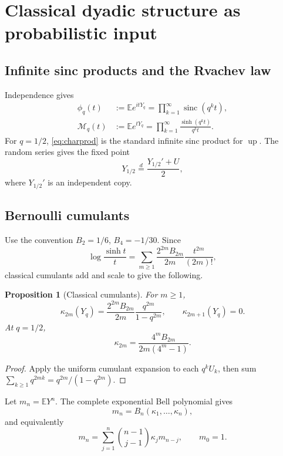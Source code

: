\documentclass[11pt]{article}
\newtheorem{proposition}[theorem]{Proposition}
\theoremstyle{definition}
\newcommand{\Up}{\operatorname{up}}
\newcommand{\sinc}{\operatorname{sinc}}
\newcommand{\E}{\mathbb{E}}
\begin{document}
\section{Classical dyadic structure as probabilistic input}
\subsection{Infinite sinc products and the Rvachev law}
Independence gives
\begin{align}
\phi_q(t)&:=\E e^{itY_q}=\prod_{k=1}^{\infty}\sinc(q^kt),\label{eq:charprod}\\
\mathcal M_q(t)&:=\E e^{tY_q}=\prod_{k=1}^{\infty}\frac{\sinh(q^kt)}{q^kt}.\label{eq:mgfprod}
\end{align}
For \(q=1/2\), \eqref{eq:charprod} is the standard infinite sinc product for \(\Up\). The random series gives the fixed point
\begin{equation}\label{eq:fixedY}
Y_{1/2}\stackrel{d}{=}\frac{Y_{1/2}'+U}{2},
\end{equation}
where \(Y_{1/2}'\) is an independent copy.

\subsection{Bernoulli cumulants}
Use the convention \(B_2=1/6\), \(B_4=-1/30\). Since
\[
\log\frac{\sinh t}{t}=\sum_{m\ge1}\frac{2^{2m}B_{2m}}{2m}\frac{t^{2m}}{(2m)!},
\]
classical cumulants add and scale to give the following.

\begin{proposition}[Classical cumulants]\label{prop:classicalq}
For \(m\ge1\),
\begin{equation}\label{eq:kappaq}
\kappa_{2m}(Y_q)=\frac{2^{2m}B_{2m}}{2m}\frac{q^{2m}}{1-q^{2m}},
\qquad \kappa_{2m+1}(Y_q)=0.
\end{equation}
At \(q=1/2\),
\begin{equation}\label{eq:kappadyadic}
\kappa_{2m}=\frac{4^mB_{2m}}{2m(4^m-1)}.
\end{equation}
\end{proposition}
\begin{proof}
Apply the uniform cumulant expansion to each \(q^kU_k\), then sum \(\sum_{k\ge1}q^{2mk}=q^{2m}/(1-q^{2m})\).
\end{proof}

Let \(m_n=\E Y^n\). The complete exponential Bell polynomial gives
\begin{equation}\label{eq:bellmoment}
m_n=B_n(\kappa_1,\ldots,\kappa_n),
\end{equation}
and equivalently
\begin{equation}\label{eq:momentcumrec}
m_n=\sum_{j=1}^n\binom{n-1}{j-1}\kappa_jm_{n-j},\qquad m_0=1.
\end{equation}
\end{document}
